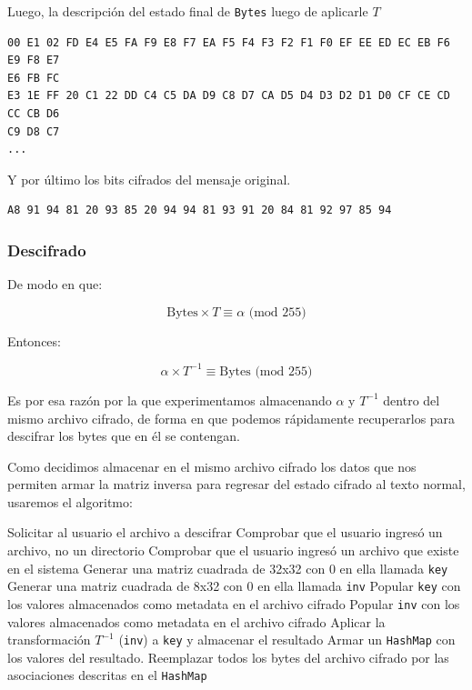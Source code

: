 \documentclass[a4paper]{article}
\begin{document}
Luego, la descripción del estado final de \texttt{Bytes} luego de aplicarle $T$

\begin{verbatim}
00 E1 02 FD E4 E5 FA F9 E8 F7 EA F5 F4 F3 F2 F1 F0 EF EE ED EC EB F6 E9 F8 E7
E6 FB FC
E3 1E FF 20 C1 22 DD C4 C5 DA D9 C8 D7 CA D5 D4 D3 D2 D1 D0 CF CE CD CC CB D6
C9 D8 C7
...
\end{verbatim}

Y por último los bits cifrados del mensaje original.

\begin{verbatim}
A8 91 94 81 20 93 85 20 94 94 81 93 91 20 84 81 92 97 85 94
\end{verbatim}

\subsubsection{Descifrado}

De modo en que:

\[
\text{Bytes} \times T \equiv \alpha \text{ (mod 255)}
\]

Entonces:


\[
\alpha \times T^{-1} \equiv \text{Bytes} \text{ (mod 255)}
\]

Es por esa razón por la que experimentamos almacenando $\alpha$ y $T^{-1}$
dentro del mismo archivo cifrado, de forma en que podemos rápidamente
recuperarlos para descifrar los bytes que en él se contengan.

Como decidimos almacenar en el mismo archivo cifrado los datos que nos permiten
armar la matriz inversa para regresar del estado cifrado al texto normal,
usaremos el algoritmo:

\begin{outline}[enumerate]
    \1 Solicitar al usuario el archivo a descifrar
    \1 Comprobar que el usuario ingresó un archivo, no un directorio
    \1 Comprobar que el usuario ingresó un archivo que existe en el sistema
    \1 Generar una matriz cuadrada de 32x32 con 0 en ella llamada \texttt{key}
    \1 Generar una matriz cuadrada de 8x32 con 0 en ella llamada \texttt{inv}
\1 Popular \texttt{key} con los valores almacenados como metadata en el archivo
cifrado
\1 Popular \texttt{inv} con los valores almacenados como metadata en el archivo
cifrado
\1 Aplicar la transformación $T^{-1}$ (\texttt{inv}) a \texttt{key} y almacenar
el resultado
    \1 Armar un \texttt{HashMap} con los valores del resultado.
\1 Reemplazar todos los bytes del archivo cifrado por las asociaciones
descritas en el \texttt{HashMap}
\end{outline}
\end{document}
